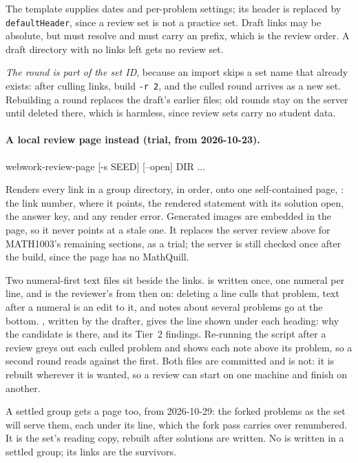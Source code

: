 The template supplies dates and per-problem settings; its header is replaced by \texttt{defaultHeader}, since a review set is not a practice set.
Draft links may be absolute, but must resolve and must carry an  prefix, which is the review order.
A draft directory with no links left gets no review set.

\emph{The round is part of the set ID}, because an import skips a set name that already exists: after culling links, build \texttt{-r 2}, and the culled round arrives as a new set.
Rebuilding a round replaces the draft's earlier  files; old rounds stay on the server until deleted there, which is harmless, since review sets carry no student data.

\paragraph{A local review page instead (trial, from 2026-10-23).}
\begin{manexsource}
webwork-review-page [-s SEED] [--open] DIR ...
\end{manexsource}

Renders every  link in a group directory, in  order, onto one self-contained page, : the link number, where it points, the rendered statement with its solution open, the answer key, and any render error.
Generated images are embedded in the page, so it never points at a stale one.
It replaces the server review above for MATH1003's remaining sections, as a trial; the server is still checked once after the build, since the page has no MathQuill.

Two numeral-first text files sit beside the links.
 is written once, one numeral per line, and is the reviewer's from then on: deleting a line culls that problem, text after a numeral is an edit to it, and notes about several problems go at the bottom.
, written by the drafter, gives the line shown under each heading: why the candidate is there, and its Tier~2 findings.
Re-running the script after a review greys out each culled problem and shows each note above its problem, so a second round reads against the first.
Both files are committed and  is not: it is rebuilt wherever it is wanted, so a review can start on one machine and finish on another.

A settled group gets a page too, from 2026-10-29: the forked problems as the set will serve them, each under its  line, which the fork pass carries over renumbered.
It is the set's reading copy, rebuilt after solutions are written.
No  is written in a settled group; its links are the survivors.

